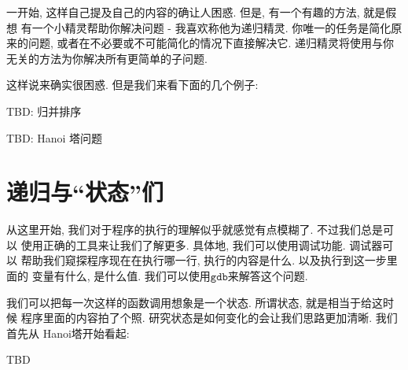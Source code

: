 一开始, 这样自己提及自己的内容的确让人困惑. 但是, 有一个有趣的方法, 就是假想
有一个小精灵帮助你解决问题 - 我喜欢称他为递归精灵. 
你唯一的任务是简化原来的问题, 或者在不必要或不可能简化的情况下直接解决它. 
递归精灵将使用与你无关的方法为你解决所有更简单的子问题. 

这样说来确实很困惑. 但是我们来看下面的几个例子: 

\begin{example}
    TBD: 归并排序
\end{example}


\begin{example}
    TBD: Hanoi 塔问题
\end{example}

\section{递归与``状态''们}

从这里开始, 我们对于程序的执行的理解似乎就感觉有点模糊了. 不过我们总是可以
使用正确的工具来让我们了解更多. 具体地, 我们可以使用调试功能. 调试器可以
帮助我们窥探程序现在在执行哪一行, 执行的内容是什么. 以及执行到这一步里面的
变量有什么, 是什么值. 我们可以使用$\texttt{gdb}$来解答这个问题. 

我们可以把每一次这样的函数调用想象是一个状态. 所谓状态, 就是相当于给这时候
程序里面的内容拍了个照. 研究状态是如何变化的会让我们思路更加清晰. 我们首先从
Hanoi塔开始看起: 

TBD



